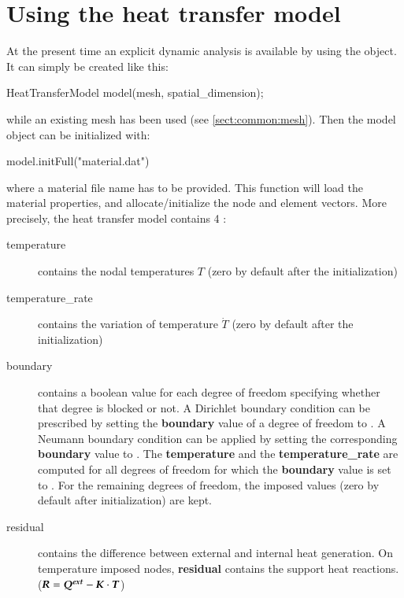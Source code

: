\section{Using the heat transfer model}
At the present time an explicit dynamic analysis is available by
using the   object.
It can simply be created like this:
\begin{cpp}
  HeatTransferModel model(mesh, spatial_dimension);
\end{cpp}
while an existing mesh has been used (see \ref{sect:common:mesh}).
Then the model object can be initialized with:
\begin{cpp}
  model.initFull("material.dat")
\end{cpp}
where a material file name has to be provided. This function will load the material 
properties, and allocate/initialize the node and element vectors.
More precisely, the heat transfer model contains 4 :
\begin{description}
\item[temperature] contains the nodal temperatures $T$ (zero  by   default  after  the
  initialization) 
\item[temperature\_rate] contains the variation of temperature $\dot{T}$ 
  (zero  by   default  after  the
  initialization) 

\item[boundary] contains a  boolean value for each degree  of freedom specifying
  whether that degree  is blocked or not. A Dirichlet  boundary condition can be
  prescribed by  setting the \textbf{boundary} value  of a degree  of freedom to
  .   A Neumann  boundary condition  can  be applied  by setting  the
  corresponding     \textbf{boundary}     value     to    .      The
  \textbf{temperature} and  the \textbf{temperature\_rate} are  computed for all
  degrees  of  freedom   for  which  the  \textbf{boundary}  value   is  set  to
  .  For the remaining degrees  of freedom, the imposed values (zero
  by default after  initialization) are kept. 

\item[residual] contains the difference between external and internal heat generation. On
  temperature imposed nodes,  \textbf{residual} contains the support heat reactions. ($\boldsymbol{R} = \boldsymbol{Q^{ext}} -\boldsymbol{K} \cdot \boldsymbol{T}$)
\end{description}

